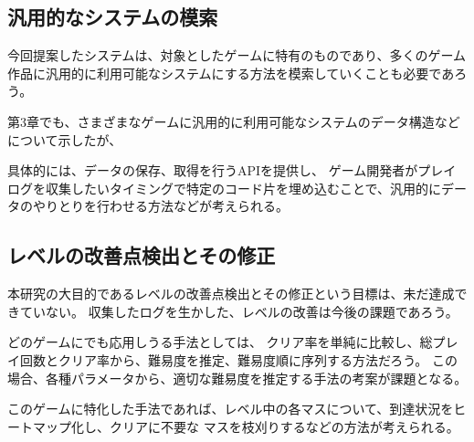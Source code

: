 \subsection{汎用的なシステムの模索}
今回提案したシステムは、対象としたゲームに特有のものであり、多くのゲーム作品に汎用的に利用可能なシステムにする方法を模索していくことも必要であろう。

第3章でも、さまざまなゲームに汎用的に利用可能なシステムのデータ構造などについて示したが、


具体的には、データの保存、取得を行うAPIを提供し、
ゲーム開発者がプレイログを収集したいタイミングで特定のコード片を埋め込むことで、汎用的にデータのやりとりを行わせる方法などが考えられる。

\subsection{レベルの改善点検出とその修正}
本研究の大目的であるレベルの改善点検出とその修正という目標は、未だ達成できていない。
収集したログを生かした、レベルの改善は今後の課題であろう。

どのゲームにでも応用しうる手法としては、
クリア率を単純に比較し、総プレイ回数とクリア率から、難易度を推定、難易度順に序列する方法だろう。
この場合、各種パラメータから、適切な難易度を推定する手法の考案が課題となる。

このゲームに特化した手法であれば、レベル中の各マスについて、到達状況をヒートマップ化し、クリアに不要な
マスを枝刈りするなどの方法が考えられる。
